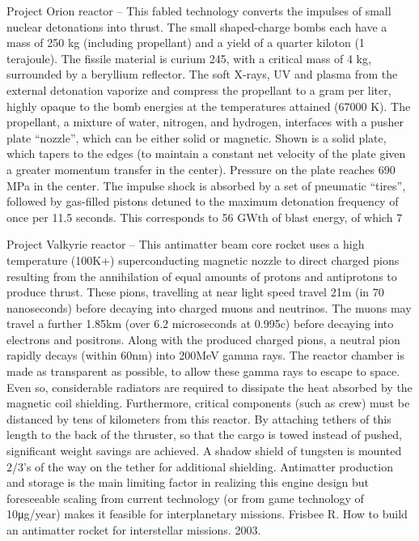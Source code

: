 \documentclass[a4paper]{book}
\begin{document}
Project Orion reactor – This fabled technology converts the impulses of small nuclear detonations into thrust.  The small shaped-charge bombs each have a mass of 250 kg (including propellant) and a yield of a quarter kiloton (1 terajoule). The fissile material is curium 245, with a critical mass of 4 kg, surrounded by a beryllium reflector.  The soft X-rays, UV and plasma from the external detonation vaporize and compress the propellant to a gram per liter, highly opaque to the bomb energies at the temperatures attained (67000 K). The propellant, a mixture of water, nitrogen, and hydrogen, interfaces with a pusher plate “nozzle”, which can be either solid or magnetic.  Shown is a solid plate, which tapers to the edges (to maintain a constant net velocity of the plate given a greater momentum transfer in the center). Pressure on the plate reaches 690 MPa in the center.  The impulse shock is absorbed by a set of pneumatic “tires”, followed by gas-filled pistons detuned to the maximum detonation frequency of once per 11.5 seconds. This corresponds to 56 GWth of blast energy, of which 7%
 
Project Valkyrie reactor – This antimatter beam core rocket uses a high temperature (100K+) superconducting magnetic nozzle to direct charged pions resulting from the annihilation of equal amounts of protons and antiprotons to produce thrust. These pions, travelling at near light speed travel 21m (in 70 nanoseconds) before decaying into charged muons and neutrinos.  The muons may travel a further 1.85km (over 6.2 microseconds at 0.995c) before decaying into electrons and positrons.  Along with the produced charged pions, a neutral pion rapidly decays (within 60nm) into 200MeV gamma rays. The reactor chamber is made as transparent as possible, to allow these gamma rays to escape to space. Even so, considerable radiators are required to dissipate the heat absorbed by the magnetic coil shielding. Furthermore, critical components (such as crew) must be distanced by tens of kilometers from this reactor. By attaching tethers of this length to the back of the thruster, so that the cargo is towed instead of pushed, significant weight savings are achieved. A shadow shield of tungsten is mounted 2/3’s of the way on the tether for additional shielding. Antimatter production and storage is the main limiting factor in realizing this engine design but foreseeable scaling from current technology (or from game technology of 10μg/year) makes it feasible for interplanetary missions.
Frisbee R. How to build an antimatter rocket for interstellar missions. 2003.
\end{document}

